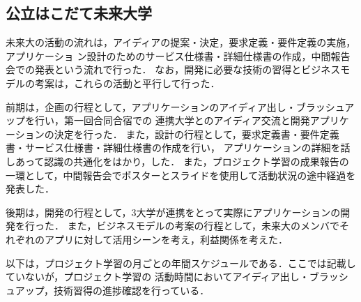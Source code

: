 \subsection{公立はこだて未来大学}

\par
未来大の活動の流れは，アイディアの提案・決定，要求定義・要件定義の実施，アプリケーショ
ン設計のためのサービス仕様書・詳細仕様書の作成，中間報告会での発表という流れで行った．
なお，開発に必要な技術の習得とビジネスモデルの考案は，これらの活動と平行して行った．

\par
前期は，企画の行程として，アプリケーションのアイディア出し・ブラッシュアップを行い，第一回合同合宿での
連携大学とのアイディア交流と開発アプリケーションの決定を行った．
また，設計の行程として，要求定義書・要件定義書・サービス仕様書・詳細仕様書の作成を行い，
アプリケーションの詳細を話しあって認識の共通化をはかり，した．
また，プロジェクト学習の成果報告の一環として，中間報告会でポスターとスライドを使用して活動状況の途中経過を発表した．

\par
後期は，開発の行程として，3大学が連携をとって実際にアプリケーションの開発を行った．
また，ビジネスモデルの考案の行程として，未来大のメンバでそれぞれのアプリに対して活用シーンを考え，利益関係を考えた．

\par
以下は，プロジェクト学習の月ごとの年間スケジュールである．ここでは記載していないが，プロジェクト学習の
活動時間においてアイディア出し・ブラッシュアップ，技術習得の進捗確認を行っている．
\par

